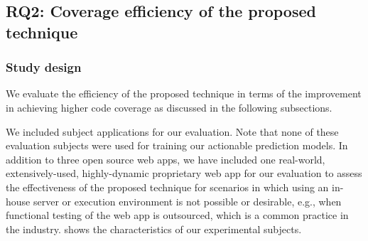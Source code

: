 \subsection{RQ2: Coverage efficiency of the proposed technique}

\subsubsection{Study design}
\label{sec:rq2-study-design}

We evaluate the efficiency of the proposed technique 
in terms of the improvement in achieving higher \js code coverage
as discussed in the following subsections.

We included \numberOfSubjectsRQTwo subject applications for our evaluation.
Note that none of these evaluation subjects 
were used 
for training our actionable prediction models.
In addition to three open source \js web apps,
we have included one real-world,
extensively-used,
highly-dynamic proprietary web app
for our evaluation to assess the effectiveness of the proposed technique
for scenarios in which using an in-house server or execution environment
is not possible or desirable,
e.g., when functional testing of the web app is outsourced,
which is a common practice in the industry.
 shows the characteristics of our experimental subjects.

